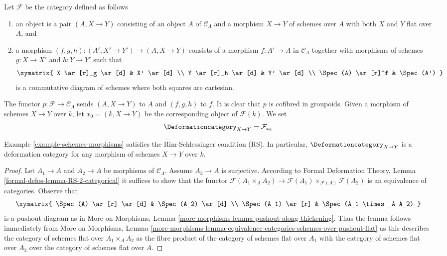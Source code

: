 \begin{example}
\label{example-schemes-morphisms}
Let $\mathcal{F}$ be the category defined as follows
\begin{enumerate}
\item an object is a pair $(A, X \to Y)$ consisting of an
object $A$ of $\mathcal{C}_\Lambda$ and a morphism
$X \to Y$ of schemes over $A$ with both $X$ and $Y$ flat over $A$, and
\item a morphism $(f, g, h) : (A', X' \to Y') \to (A, X \to Y)$ consists of
a morphism $f : A' \to A$ in $\mathcal{C}_\Lambda$ together
with morphisms of schemes $g : X \to X'$ and $h : Y \to Y'$ such that
$$
\xymatrix{
X \ar[r]_g \ar[d] & X' \ar[d] \\
Y \ar[r]_h \ar[d] & Y' \ar[d] \\
\Spec(A) \ar[r]^f & \Spec(A')
}
$$
is a commutative diagram of schemes where both squares are cartesian.
\end{enumerate}
The functor $p : \mathcal{F} \to \mathcal{C}_\Lambda$ sends $(A, X \to Y)$
to $A$ and $(f, g, h)$ to $f$. It is clear that $p$ is cofibred in groupoids.
Given a morphism of schemes $X \to Y$ over $k$, let $x_0 = (k, X \to Y)$
be the corresponding object of $\mathcal{F}(k)$. We set
$$
\Deformationcategory_{X \to Y} = \mathcal{F}_{x_0}
$$
\end{example}

\begin{lemma}
\label{lemma-schemes-morphisms-RS}
Example \ref{example-schemes-morphisms}
satisfies the Rim-Schlessinger condition (RS).
In particular, $\Deformationcategory_{X \to Y}$ is a deformation category
for any morphism of schemes $X \to Y$ over $k$.
\end{lemma}

\begin{proof}
Let $A_1 \to A$ and $A_2 \to A$ be morphisms of $\mathcal{C}_\Lambda$.
Assume $A_2 \to A$ is surjective. According to
Formal Deformation Theory, Lemma
\ref{formal-defos-lemma-RS-2-categorical}
it suffices to show that the functor
$\mathcal{F}(A_1 \times_A A_2) \to
\mathcal{F}(A_1) \times_{\mathcal{F}(A)} \mathcal{F}(A_2)$
is an equivalence of categories.
Observe that
$$
\xymatrix{
\Spec(A) \ar[r] \ar[d] & \Spec(A_2) \ar[d] \\
\Spec(A_1) \ar[r] &
\Spec(A_1 \times_A A_2)
}
$$
is a pushout diagram as in More on Morphisms, Lemma
\ref{more-morphisms-lemma-pushout-along-thickening}.
Thus the lemma follows immediately from
More on Morphisms, Lemma
\ref{more-morphisms-lemma-equivalence-categories-schemes-over-pushout-flat}
as this describes the category of schemes flat over $A_1 \times_A A_2$
as the fibre product of the category of schemes flat over $A_1$
with the category of schemes flat over $A_2$ over the category of
schemes flat over $A$.
\end{proof}

